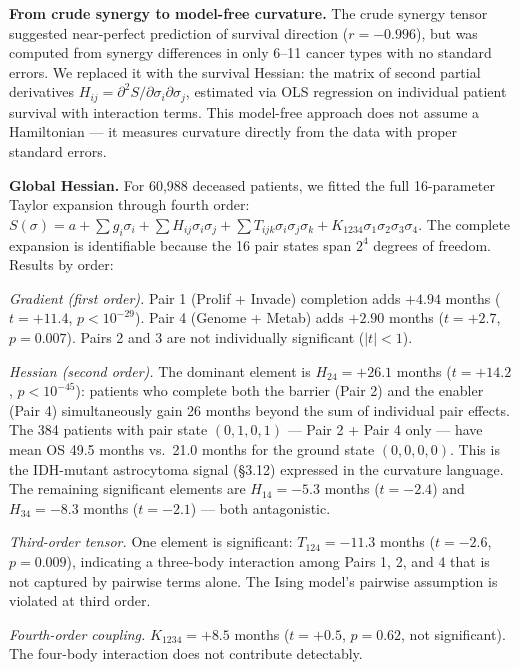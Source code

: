 \documentclass[
  11pt,
]{article}
\begin{document}
\textbf{From crude synergy to model-free curvature.} The crude synergy
tensor suggested near-perfect prediction of survival direction
(\(r = -0.996\)), but was computed from synergy differences in only
6--11 cancer types with no standard errors. We replaced it with the
survival Hessian: the matrix of second partial derivatives
\(H_{ij} = \partial^2 S / \partial \sigma_i \partial \sigma_j\),
estimated via OLS regression on individual patient survival with
interaction terms. This model-free approach does not assume a
Hamiltonian --- it measures curvature directly from the data with proper
standard errors.

\textbf{Global Hessian.} For 60,988 deceased patients, we fitted the
full 16-parameter Taylor expansion through fourth order:
\(S(\sigma) = a + \sum g_i \sigma_i + \sum H_{ij} \sigma_i \sigma_j + \sum T_{ijk} \sigma_i \sigma_j \sigma_k + K_{1234} \sigma_1 \sigma_2 \sigma_3 \sigma_4\).
The complete expansion is identifiable because the 16 pair states span
\(2^4\) degrees of freedom. Results by order:

\emph{Gradient (first order).} Pair 1 (Prolif + Invade) completion adds
\(+4.94\) months (\(t = +11.4\), \(p < 10^{-29}\)). Pair 4 (Genome +
Metab) adds \(+2.90\) months (\(t = +2.7\), \(p = 0.007\)). Pairs 2 and
3 are not individually significant (\(|t| < 1\)).

\emph{Hessian (second order).} The dominant element is
\(H_{24} = +26.1\) months (\(t = +14.2\), \(p < 10^{-45}\)): patients
who complete both the barrier (Pair 2) and the enabler (Pair 4)
simultaneously gain 26 months beyond the sum of individual pair effects.
The 384 patients with pair state \((0,1,0,1)\) --- Pair 2 + Pair 4 only
--- have mean OS 49.5 months vs.~21.0 months for the ground state
\((0,0,0,0)\). This is the IDH-mutant astrocytoma signal (§3.12)
expressed in the curvature language. The remaining significant elements
are \(H_{14} = -5.3\) months (\(t = -2.4\)) and \(H_{34} = -8.3\) months
(\(t = -2.1\)) --- both antagonistic.

\emph{Third-order tensor.} One element is significant:
\(T_{124} = -11.3\) months (\(t = -2.6\), \(p = 0.009\)), indicating a
three-body interaction among Pairs 1, 2, and 4 that is not captured by
pairwise terms alone. The Ising model's pairwise assumption is violated
at third order.

\emph{Fourth-order coupling.} \(K_{1234} = +8.5\) months (\(t = +0.5\),
\(p = 0.62\), not significant). The four-body interaction does not
contribute detectably.
\end{document}
